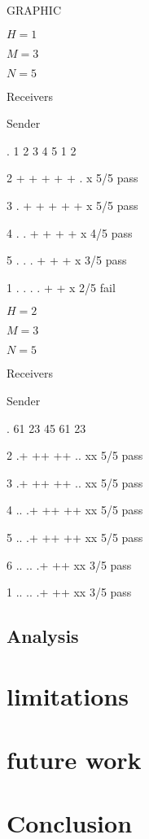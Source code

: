 \documentclass{article}
\begin{document}
GRAPHIC

$H = 1$

$M = 3$

$N = 5$

Receivers

  Sender

. 1 2 3 4 5 1 2
  
2 + + + + + . x 5/5 pass

3 . + + + + + x 5/5 pass

4 . . + + + + x 4/5 pass

5 . . . + + + x 3/5 pass

1 . . . . + + x 2/5 fail



$H = 2$

$M = 3$

$N = 5$

Receivers

  Sender

. 61 23 45 61 23
  
2 .+ ++ ++ .. xx 5/5 pass

3 .+ ++ ++ .. xx 5/5 pass

4 .. .+ ++ ++ xx 5/5 pass

5 .. .+ ++ ++ xx 5/5 pass

6 .. .. .+ ++ xx 3/5 pass

1 .. .. .+ ++ xx 3/5 pass

\subsection{Analysis}



\section{limitations}
\section{future work}
\section{Conclusion}
\end{document}
